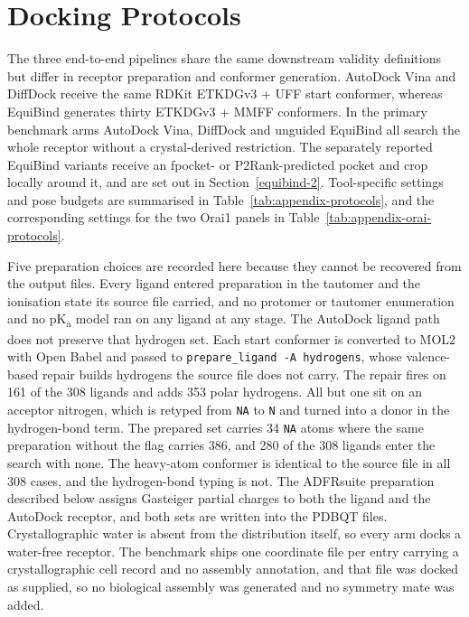 \hypertarget{docking-protocols}{%
\chapter{Docking Protocols}\label{docking-protocols}}

The three end-to-end pipelines share the same downstream validity definitions but differ in receptor preparation and conformer generation. AutoDock Vina and DiffDock receive the same RDKit \cite{ref086} ETKDGv3 + UFF start conformer, whereas EquiBind generates thirty ETKDGv3 + MMFF conformers. In the primary benchmark arms AutoDock Vina, DiffDock and unguided EquiBind all search the whole receptor without a crystal-derived restriction. The separately reported EquiBind variants receive an fpocket- or P2Rank-predicted pocket and crop locally around it, and are set out in Section~\ref{equibind-2}. Tool-specific settings and pose budgets are summarised in Table~\ref{tab:appendix-protocols}, and the corresponding settings for the two Orai1 panels in Table~\ref{tab:appendix-orai-protocols}.

Five preparation choices are recorded here because they cannot be recovered from the output files. Every ligand entered preparation in the tautomer and the ionisation state its source file carried, and no protomer or tautomer enumeration and no pK\textsubscript{a} model ran on any ligand at any stage. The AutoDock ligand path does not preserve that hydrogen set. Each start conformer is converted to MOL2 with Open Babel and passed to \texttt{prepare\_ligand -A hydrogens}, whose valence-based repair builds hydrogens the source file does not carry. The repair fires on 161 of the 308 ligands and adds 353 polar hydrogens. All but one sit on an acceptor nitrogen, which is retyped from \texttt{NA} to \texttt{N} and turned into a donor in the hydrogen-bond term. The prepared set carries 34 \texttt{NA} atoms where the same preparation without the flag carries 386, and 280 of the 308 ligands enter the search with none. The heavy-atom conformer is identical to the source file in all 308 cases, and the hydrogen-bond typing is not. The ADFRsuite preparation described below assigns Gasteiger partial charges to both the ligand and the AutoDock receptor, and both sets are written into the PDBQT files. Crystallographic water is absent from the distribution itself, so every arm docks a water-free receptor. The benchmark ships one coordinate file per entry carrying a crystallographic cell record and no assembly annotation, and that file was docked as supplied, so no biological assembly was generated and no symmetry mate was added.

